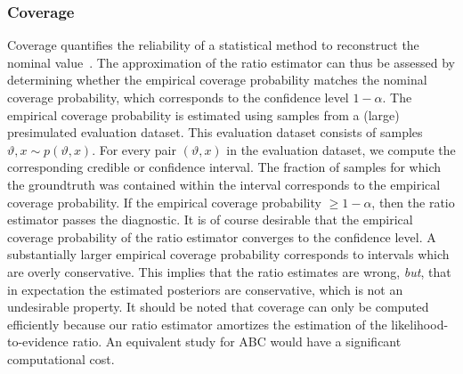 \documentclass[fleqn,usenatbib]{mnras}
\begin{document}
\subsubsection{Coverage}
\label{sec:diagnostic_coverage}
Coverage quantifies the
reliability of a statistical method to reconstruct the nominal value~\citep{neymanconstruction,schall2012empirical,strege2012fundamental,2013arXiv1301.3166P}.
The approximation of the ratio estimator can thus be assessed by
determining whether the empirical coverage probability matches the
nominal coverage probability, which corresponds to the confidence level $1 - \alpha$.
The empirical coverage probability is estimated using samples from a (large) presimulated evaluation dataset.
This evaluation dataset consists of samples $\vartheta,x\sim p(\vartheta,x)$.
For every pair $(\vartheta, x)$ in the evaluation dataset, we compute
the corresponding credible or confidence interval.
The fraction of samples for which the groundtruth was contained within the interval corresponds to the
empirical coverage probability.
If the empirical coverage probability $\geq 1 - \alpha$, then the ratio estimator passes the diagnostic.
It is of course desirable that the empirical coverage probability of the ratio estimator converges to the confidence level.
A substantially larger empirical coverage probability corresponds to intervals which are overly conservative.
This implies that the ratio estimates are wrong, \emph{but}, that in expectation the estimated posteriors are conservative,
which is not an undesirable property.
It should be noted that coverage can only be computed efficiently
because our ratio estimator amortizes the estimation of the likelihood-to-evidence
ratio. An equivalent study for ABC would have a significant computational cost.
\end{document}

